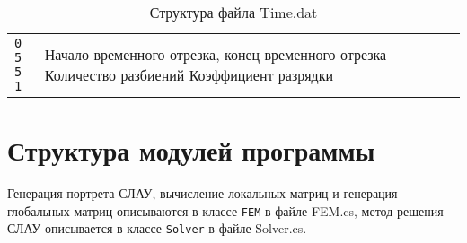 \begin{table}
    \caption{Структура файла Time.dat}
    \centering
    \small
    \begin{tabularx}{1.0\textwidth}{| >{\raggedright\arraybackslash}X | >{\raggedright\arraybackslash}X | }
        \hline
        \centering{Данные в файле} & \centering{Пояснение} \tabularnewline
        \hline
\texttt{0 5 \newline
        5 \newline
        1}
        & 
        Начало временного отрезка, конец временного отрезка \newline
        Количество разбиений \newline
        Коэффициент разрядки \tabularnewline
        \hline
    \end{tabularx}
    \label{tab:timedatstr}
\end{table}

\section{Структура модулей программы}
Генерация портрета СЛАУ, вычисление локальных матриц и генерация глобальных матриц описываются в классе \texttt{FEM} в файле FEM.cs, метод решения СЛАУ описывается в классе \texttt{Solver} в файле Solver.cs.